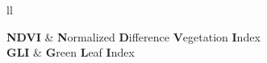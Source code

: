 \begin{abbreviations}{ll} %

    \textbf{NDVI} & \textbf{N}ormalized \textbf{D}ifference \textbf{V}egetation \textbf{I}ndex\\

    \textbf{GLI} & \textbf{G}reen \textbf{L}eaf \textbf{I}ndex\\

\end{abbreviations}
